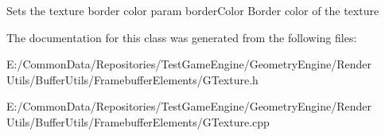 Sets the texture border color param border\+Color Border color of the texture 

The documentation for this class was generated from the following files\+:\begin{DoxyCompactItemize}
\item 
E\+:/\+Common\+Data/\+Repositories/\+Test\+Game\+Engine/\+Geometry\+Engine/\+Render Utils/\+Buffer\+Utils/\+Framebuffer\+Elements/G\+Texture.\+h\item 
E\+:/\+Common\+Data/\+Repositories/\+Test\+Game\+Engine/\+Geometry\+Engine/\+Render Utils/\+Buffer\+Utils/\+Framebuffer\+Elements/G\+Texture.\+cpp\end{DoxyCompactItemize}
